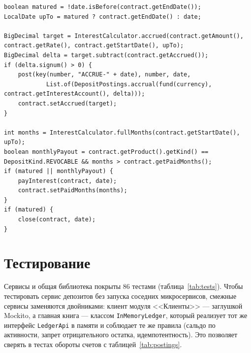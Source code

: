 \documentclass[14pt,a4paper]{extarticle}
\begin{document}
\begin{lstlisting}[style=java, caption={Начисление, выплата и закрытие договора (\texttt{DepositService.processDay})}, label={lst:day}]
boolean matured = !date.isBefore(contract.getEndDate());
LocalDate upTo = matured ? contract.getEndDate() : date;

BigDecimal target = InterestCalculator.accrued(contract.getAmount(), contract.getRate(), contract.getStartDate(), upTo);
BigDecimal delta = target.subtract(contract.getAccrued());
if (delta.signum() > 0) {
    post(key(number, "ACCRUE-" + date), number, date,
            List.of(DepositPostings.accrual(fund(currency), contract.getInterestAccount(), delta)));
    contract.setAccrued(target);
}

int months = InterestCalculator.fullMonths(contract.getStartDate(), upTo);
boolean monthlyPayout = contract.getProduct().getKind() == DepositKind.REVOCABLE && months > contract.getPaidMonths();
if (matured || monthlyPayout) {
    payInterest(contract, date);
    contract.setPaidMonths(months);
}
if (matured) {
    close(contract, date);
}
\end{lstlisting}

\section{Тестирование}

Сервисы и общая библиотека покрыты 86 тестами (таблица~\ref{tab:tests}). Чтобы тестировать сервис депозитов
без запуска соседних микросервисов, смежные сервисы заменяются двойниками: клиент модуля
<<Клиенты>> --- заглушкой Mockito, а главная книга --- классом \texttt{InMemoryLedger},
который реализует тот же интерфейс \texttt{LedgerApi} в памяти и соблюдает те же правила
(сальдо по активности, запрет отрицательного остатка, идемпотентность). Это позволяет
сверять в тестах обороты счетов с таблицей~\ref{tab:postings}.
\end{document}
